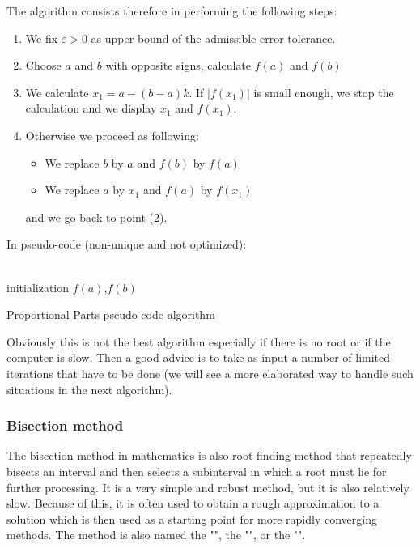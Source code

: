 	The algorithm consists therefore in performing the following steps:
	\begin{enumerate}
		\item We fix $\varepsilon>0$ as upper bound of the admissible error tolerance.		
		
		\item Choose $a$ and $b$ with opposite signs, calculate $f(a)$ and $f(b)$
		
		\item We calculate $x_1=a-(b-a)k$. If $|f(x_1)|$ is small enough, we stop the calculation and we display $x_1$ and $f(x_1)$.

		\item Otherwise we proceed as following:
		\begin{itemize}
			\item We replace $b$ by $a$ and $f(b)$ by $f(a)$
			\item We replace $a$ by $x_1$ and $f(a)$ by $f(x_1)$
		\end{itemize} 
		and we go back to point (2).
	\end{enumerate}
	In pseudo-code (non-unique and not optimized):\\\\
	\begin{algorithm}[H]
	 initialization\;
	$f(a)$,$f(b)$\;
	 \caption{Proportional Parts pseudo-code algorithm}
	\end{algorithm}
	Obviously this is not the best algorithm especially if there is no root or if the computer is slow. Then a good advice is to take as input a number of limited iterations that have to be done (we will see a more elaborated way to handle such situations in the next algorithm).
	
	\subsubsection{Bisection method}
	The bisection method in mathematics is also root-finding method that repeatedly bisects an interval and then selects a subinterval in which a root must lie for further processing. It is a very simple and robust method, but it is also relatively slow. Because of this, it is often used to obtain a rough approximation to a solution which is then used as a starting point for more rapidly converging methods. The method is also named the "", the "", or the "".
	
